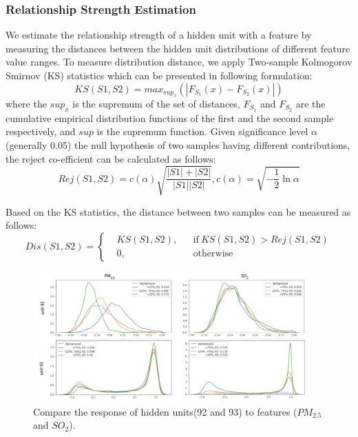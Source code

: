 \subsubsection{Relationship Strength Estimation}
\label{section:qualify_response}
We estimate the relationship strength of a hidden unit with a feature by measuring the distances between the hidden unit distributions of different feature value ranges.
To measure distribution distance, we apply Two-sample Kolmogorov Smirnov (KS) statistics which can be presented in following formulation:
\begin{equation} 
KS(S1, S2) = max_{sup_x}(|F_{S_1}(x) - F_{S_2}(x)|)
\end{equation}
where the $sup_x$ is the supremum of the set of distances, $F_{S_1}$ and $F_{S_2}$ are the cumulative empirical distribution functions of the first and the second sample respectively, and $sup$ is the supremum function.
Given significance level $\alpha$ (generally 0.05) the null hypothesis of two samples having different contributions, the reject co-efficient can be calculated as follows:
\begin{equation} 
Rej(S1, S2) = c(\alpha)\sqrt{\frac{|S1| + |S2|}{|S1||S2|}},  c(\alpha) = \sqrt{-\frac{1}{2}\ln\alpha }
\end{equation}

Based on the KS statistics, the distance between two samples can be measured as follows:
\begin{equation} 
Dis(S1, S2) = \left \{
  \begin{aligned}
    &KS(S1, S2), && \text{if}\ KS(S1, S2) > Rej(S1, S2)\\
    &0, && \text{otherwise}
  \end{aligned} \right.
\end{equation}

\begin{figure}[t]
	\centering
	\includegraphics[width=0.95\textwidth]{figure/MultiRNNExplorer/methods/unit_response_kdeplot.pdf}
	\vspace{-3mm}
	\caption{Compare the response of hidden units(92 and 93) to features ($PM_{2.5}$ and $SO_2$). 
	}
	\label{fig:unit_distribution_subgroup}
	\vspace{-1mm}
\end{figure}


